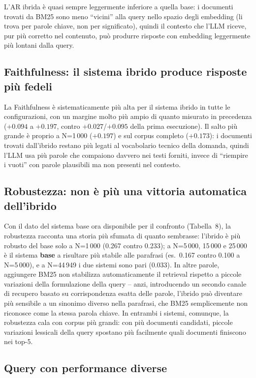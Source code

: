 \documentclass[12pt,a4paper]{article}
\begin{document}
L'AR ibrida \`e quasi sempre leggermente inferiore a quella base: i documenti trovati da BM25 sono meno ``vicini'' alla query nello spazio degli embedding (li trova per parole chiave, non per significato), quindi il contesto che l'LLM riceve, pur pi\`u corretto nel contenuto, pu\`o produrre risposte con embedding leggermente pi\`u lontani dalla query.

\subsection{Faithfulness: il sistema ibrido produce risposte pi\`u fedeli}

La Faithfulness \`e sistematicamente pi\`u alta per il sistema ibrido in tutte le configurazioni, con un margine molto pi\`u ampio di quanto misurato in precedenza ($+0.094$ a $+0.197$, contro $+0.027$/$+0.095$ della prima esecuzione). Il salto pi\`u grande \`e proprio a N=1\,000 ($+0.197$) e sul corpus completo ($+0.173$): i documenti trovati dall'ibrido restano pi\`u legati al vocabolario tecnico della domanda, quindi l'LLM usa pi\`u parole che compaiono davvero nei testi forniti, invece di ``riempire i vuoti'' con parole plausibili ma non presenti nel contesto.

\subsection{Robustezza: non \`e pi\`u una vittoria automatica dell'ibrido}

Con il dato del sistema base ora disponibile per il confronto (Tabella~8), la robustezza racconta una storia pi\`u sfumata di quanto sembrasse: l'ibrido \`e pi\`u robusto del base solo a N=1\,000 (0.267 contro 0.233); a N=5\,000, 15\,000 e 25\,000 \`e il sistema \textbf{base} a risultare pi\`u stabile alle parafrasi (es.\ 0.167 contro 0.100 a N=5\,000), e a N=44\,949 i due sistemi sono pari (0.033). In altre parole, aggiungere BM25 non stabilizza automaticamente il retrieval rispetto a piccole variazioni della formulazione della query -- anzi, introducendo un secondo canale di recupero basato su corrispondenza esatta delle parole, l'ibrido pu\`o diventare pi\`u sensibile a un sinonimo diverso nella parafrasi, che BM25 semplicemente non riconosce come la stessa parola chiave. In entrambi i sistemi, comunque, la robustezza cala con corpus pi\`u grandi: con pi\`u documenti candidati, piccole variazioni lessicali della query spostano pi\`u facilmente quali documenti finiscono nei top-5.

\subsection{Query con performance diverse}
\end{document}
